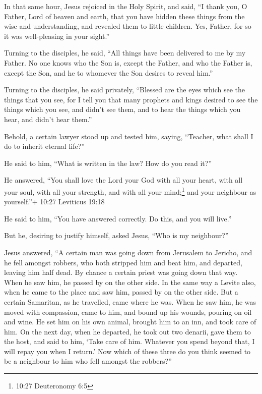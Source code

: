  In that same hour, Jesus rejoiced in the Holy Spirit, and
said, ``I thank you, O Father, Lord of heaven and earth, that you have
hidden these things from the wise and understanding, and revealed them
to little children. Yes, Father, for so it was well-pleasing in your
sight.''

 Turning to the disciples, he said, ``All things have been
delivered to me by my Father. No one knows who the Son is, except the
Father, and who the Father is, except the Son, and he to whomever the
Son desires to reveal him.''

 Turning to the disciples, he said privately, ``Blessed are
the eyes which see the things that you see,  for I tell you
that many prophets and kings desired to see the things which you see,
and didn't see them, and to hear the things which you hear, and didn't
hear them.''

 Behold, a certain lawyer stood up and tested him, saying,
``Teacher, what shall I do to inherit eternal life?''

 He said to him, ``What is written in the law? How do you
read it?''

 He answered, ``You shall love the Lord your God with all
your heart, with all your soul, with all your strength, and with all
your mind;\footnote{10:27 Deuteronomy 6:5} and your neighbour as
yourself.''+ 10:27 Leviticus 19:18

 He said to him, ``You have answered correctly. Do this,
and you will live.''

 But he, desiring to justify himself, asked Jesus, ``Who is
my neighbour?''

 Jesus answered, ``A certain man was going down from
Jerusalem to Jericho, and he fell amongst robbers, who both stripped him
and beat him, and departed, leaving him half dead.  By
chance a certain priest was going down that way. When he saw him, he
passed by on the other side.  In the same way a Levite
also, when he came to the place and saw him, passed by on the other
side.  But a certain Samaritan, as he travelled, came where
he was. When he saw him, he was moved with compassion, 
came to him, and bound up his wounds, pouring on oil and wine. He set
him on his own animal, brought him to an inn, and took care of him.
 On the next day, when he departed, he took out two
denarii, gave them to the host, and said to him, `Take care of him.
Whatever you spend beyond that, I will repay you when I return.'
 Now which of these three do you think seemed to be a
neighbour to him who fell amongst the robbers?''

